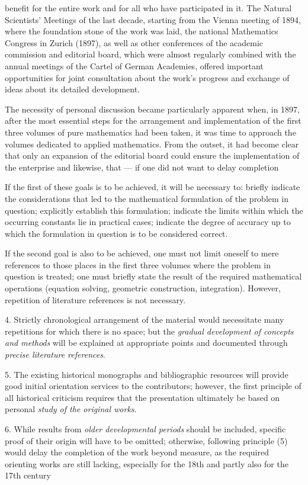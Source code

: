\thispagestyle{fancy}

\vspace{0.5cm}

benefit for the entire work and for all who have participated in it. The Natural Scientists' Meetings of the last decade, starting from the Vienna meeting of 1894, where the foundation stone of the work was laid, the national Mathematics Congress in Zurich (1897), as well as other conferences of the academic commission and editorial board, which were almost regularly combined with the annual meetings of the Cartel of German Academies, offered important opportunities for joint consultation about the work's progress and exchange of ideas about its detailed development.

The necessity of personal discussion became particularly apparent when, in 1897, after the most essential steps for the arrangement and implementation of the first three volumes of pure mathematics had been taken, it was time to approach the volumes dedicated to applied mathematics. From the outset, it had become clear that only an expansion of the editorial board could ensure the implementation of the enterprise and likewise, that — if one did not want to delay completion

\vfill
\leftline{\rule{2in}{0.4pt}}
\vspace{0.2cm}
{\footnotesize If the first of these goals is to be achieved, it will be necessary to: briefly indicate the considerations that led to the mathematical formulation of the problem in question; explicitly establish this formulation; indicate the limits within which the occurring constants lie in practical cases; indicate the degree of accuracy up to which the formulation in question is to be considered correct.

If the second goal is also to be achieved, one must not limit oneself to mere references to those places in the first three volumes where the problem in question is treated; one must briefly state the result of the required mathematical operations (equation solving, geometric construction, integration). However, repetition of literature references is not necessary.

4. Strictly chronological arrangement of the material would necessitate many repetitions for which there is no space; but the \textit{gradual development of concepts and methods} will be explained at appropriate points and documented through \textit{precise literature references}.

5. The existing historical monographs and bibliographic resources will provide good initial orientation services to the contributors; however, the first principle of all historical criticism requires that the presentation ultimately be based on personal \textit{study of the original works}.

6. While results from \textit{older developmental periods} should be included, specific proof of their origin will have to be omitted; otherwise, following principle (5) would delay the completion of the work beyond measure, as the required orienting works are still lacking, especially for the 18th and partly also for the 17th century

}
